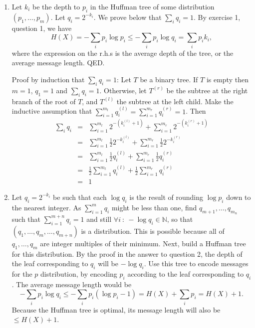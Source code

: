 \documentclass[11pt]{article} \usepackage{amssymb}
\newcommand{\N}{\mathbb N} \newcommand{\R}{\mathbb R}
\newcommand{\half}{{\textstyle \frac12}}
\begin{document}
\begin{enumerate}
\item
Let $k_i$ be the depth to $p_i$ in the Huffman tree of some distribution
$(p_1,\ldots,p_m)$. Let $q_i=2^{-k_i}$. We prove below that $\sum_iq_i=1$. By exercise 1,
question 1, we have
\begin{equation*}
  H(X)=-\sum_ip_i\log p_i\leq -\sum_ip_i\log q_i=\sum_ip_ik_i,
\end{equation*}
where the expression on the r.h.s is the average depth of the tree, or the
average message length. QED.

Proof by induction that $\sum_iq_i=1$:
Let $T$ be a binary tree. If $T$ is empty then $m=1$, $q_1=1$ and $\sum_iq_i=1$.
Otherwise, let $T^{(r)}$ be the subtree at the right branch of the root of $T$,
and $T^{(l)}$ the subtree at the left child. Make the inductive assumption that
$\sum_{i=1}^{m_l}q_i^{(l)}=\sum_{i=1}^{m_r}q_i^{(r)}=1$. Then 
\begin{eqnarray*}
\sum_iq_i
   &=&\sum_{i=1}^{m_l}2^{-(k_i^{(l)}+1)}+\sum_{i=1}^{m_r}2^{-(k_i^{(r)}+1)}
\\ &=&\sum_{i=1}^{m_l}\half 2^{-k_i^{(l)}}+\sum_{i=1}^{m_r}\half 2^{-k_i^{(r)}}
\\ &=&\sum_{i=1}^{m_l}\half q_i^{(l)}+\sum_{i=1}^{m_r}\half q_i^{(r)}
\\ &=&\half\sum_{i=1}^{m_l}q_i^{(l)}+\half\sum_{i=1}^{m_r}q_i^{(r)}
\\ &=& 1
\end{eqnarray*}

\item
Let $q_i=2^{-k_i}$ be such that each $\log q_i$ is the result of 
rounding $\log p_i$ down to the nearest integer.
As $\sum_{i=1}^mq_i$ might be less than one, find $q_{m+1},\ldots,q_{m_n}$ 
such that $\sum_{i=1}^{m+n}q_i=1$ and still $\forall i\::\:-\log q_i\in\N$, 
so that $(q_1,\ldots,q_m,\ldots,q_{m+n})$ is a distribution. 
This is possible because
all of $q_1,\ldots,q_m$ are integer multiples of their minimum.
 Next, build a Huffman
tree for this distribution. By the proof in the answer to question 2, 
the depth of the leaf corresponding
to $q_i$ will be $-\log q_i$. Use this tree to encode messages for the $p$
distribution, by encoding $p_i$ according to the leaf corresponding
to $q_i$. The average message length would be 
\begin{equation*}
  -\sum_ip_i\log q_i \leq -\sum_ip_i(\log p_i-1) = H(X)+\sum_ip_i=H(X)+1.
\end{equation*}
Because the Huffman tree is optimal, its message length will also be $\leq H(X)+1$.
\end{enumerate}
\end{document}
